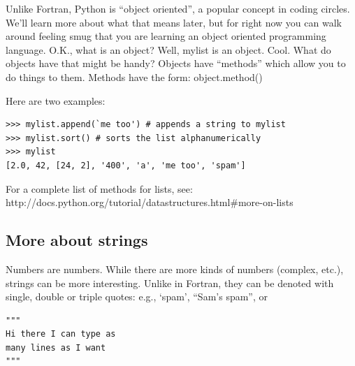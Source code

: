 \documentclass[11pt]{book}
\begin{document}
Unlike Fortran, Python is ``object oriented'', a popular concept in coding circles.  We'll learn more about what that means later, but for right now you can walk around feeling smug that you are learning an object oriented programming language.   O.K., what is an object?  Well, 
{\color{blue}mylist} is an object.   Cool.  What do objects have that might be handy?  
Objects have ``methods'' which allow you to do things to them.  Methods have the form:
{\color{blue}object.method()}

\noindent
Here are two examples:

{ \color{blue} \begin{verbatim}
>>> mylist.append(`me too') # appends a string to mylist
>>> mylist.sort() # sorts the list alphanumerically
>>> mylist
[2.0, 42, [24, 2], '400', 'a', 'me too', 'spam']
\end{verbatim}}


\noindent

 For a complete list of methods for lists, see:
http://docs.python.org/tutorial/datastructures.html\#more-on-lists

\subsection{More about strings}
Numbers are numbers. While there are more kinds of numbers (complex, etc.),
strings can be  more interesting. Unlike in Fortran, they can be denoted with single, double or triple quotes:  e.g.,
`spam',  ``Sam's spam'', or
{ \color{blue} \begin{verbatim}
"""  
Hi there I can type as
many lines as I want
"""
\end{verbatim}}
\end{document}
